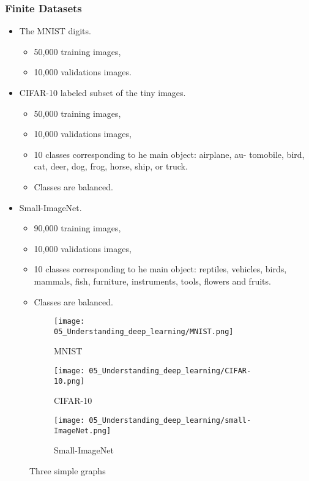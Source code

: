 \begin{frame}
  \frametitle{Finite Datasets}

  \begin{itemize}
    \item The MNIST digits. 
    \begin{itemize}
      \item 50,000 training images,
      \item 10,000 validations images.
    \end{itemize}
    \item CIFAR-10 labeled subset of the tiny images. 
    \begin{itemize}
      \item 50,000 training images,
      \item 10,000 validations images,
      \item 10 classes corresponding to he main object:  airplane, au- tomobile, bird, cat, deer, dog, frog, horse, ship, or truck.
      \item Classes are balanced. 
    \end{itemize}

    \item Small-ImageNet. 
   \begin{itemize}
      \item 90,000 training images,
      \item 10,000 validations images,
      \item 10 classes corresponding to he main object: reptiles, vehicles, birds, mammals, fish, furniture, instruments, tools, flowers and fruits.
      \item Classes are balanced. 
    \end{itemize}
  \end{itemize}

\end{frame}

\begin{frame}
  \begin{figure}
    \centering
    \begin{subfigure}[b]{0.3\textwidth}
        \centering
        \texttt{[image: 05\_Understanding\_deep\_learning/MNIST.png]}
        \caption{MNIST}
        \label{fig:y equals x}
    \end{subfigure}
    \hfill
    \begin{subfigure}[b]{0.3\textwidth}
        \centering
        \texttt{[image: 05\_Understanding\_deep\_learning/CIFAR-10.png]}
        \caption{CIFAR-10}
        \label{fig:three sin x}
    \end{subfigure}
    \hfill
    \begin{subfigure}[b]{0.3\textwidth}
        \centering
        \texttt{[image: 05\_Understanding\_deep\_learning/small-ImageNet.png]}
        \caption{Small-ImageNet}
        \label{fig:five over x}
    \end{subfigure}
       \caption{Three simple graphs}
       \label{fig:three graphs}
\end{figure}
\end{frame}

